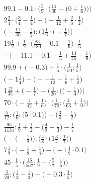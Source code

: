 \documentclass[8pt]{article}
\begin{document}
\begin{align}
99.1 - 0.1 \cdot \bigg(\frac{5}{9} \cdot \Big(\frac{11}{30} - \big(0 + \frac{1}{6}\big)\Big)\bigg) \\
2\frac{2}{4} \cdot \big(\frac{3}{4} - \frac{1}{4}\big) - \big(-\frac{1}{12} + \frac{2}{3} \cdot \frac{1}{2}\big) \\
\Big(-\frac{11}{30} - \frac{1}{5}\Big) : \Big(1\frac{1}{6} \cdot \big(-\frac{1}{7}\big)\Big) \\
19\frac{1}{2} + \frac{1}{2} \cdot \big(\frac{83}{180} - 0.1 - \frac{1}{9}\big) \cdot \frac{1}{5} \\
-\big(-11.1 - 0.1 - \frac{1}{5} + \frac{14}{45} - \frac{1}{9}\big) \\
99.9 + \big(-0.3\big) + \frac{1}{5} \cdot \big(\frac{1}{50} : \frac{1}{5}\big) \\
\big(-1\frac{1}{4}\big) - \big(--\frac{1}{12} - \frac{1}{6} + \frac{1}{2}\big) \\
1\frac{12}{35} + \bigg(-\frac{1}{7}\bigg) - \bigg(\frac{1}{20} : \Big(\big(-\frac{1}{4}\big)\Big)\bigg) \\
70 \cdot \Big(-\frac{1}{42} + \frac{1}{6}\Big) \cdot \Big(\frac{1}{70} : \big(\frac{2}{63} + \frac{1}{9}\big)\Big) \\
\frac{5}{12} : \Big(\frac{1}{6} : \big(5 \cdot 0.1\big)\Big) - \Big(\frac{3}{4} - \frac{1}{2}\Big) \\
\frac{95}{1134} : \frac{1}{9} + \frac{1}{2} - \big(\frac{4}{9} - \frac{1}{3}\big) - \frac{1}{7} \\
\Big(-\big(-\frac{1}{8}\big)\Big) : \Big(\frac{4}{8} \cdot \big(1\frac{3}{4} \cdot \frac{1}{7}\big)\Big) \\
7\frac{1}{9} \cdot \big(-\frac{1}{8} + \frac{1}{4}\big) - \big(-1\frac{1}{9} \cdot 0.1\big) \\
45 \cdot \frac{1}{5} \cdot \Big(\frac{16}{567} : \frac{1}{9} - \big(\frac{5}{7} \cdot \frac{1}{5}\big)\Big) \\
\frac{3}{20} : \big(\frac{1}{2} - \frac{1}{3}\big) - \big(-0.3 \cdot \frac{1}{3}\big)
\end{align}
\end{document}
